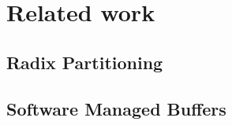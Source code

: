 
\chapter{Related work}\label{chapter:related_work}

\section{Radix Partitioning}

\section{Software Managed Buffers}
